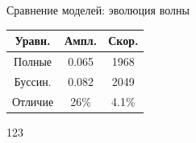 \documentclass[usenames,dvipsnames]{beamer}
\begin{document}
\begin{frame}{Сравнение моделей: эволюция волны}
\vspace{2mm}
\begin{minipage}{\textwidth}
	\begin{minipage}[b]{0.6\textwidth}
	\end{minipage}
	\hfill
	\begin{minipage}[b]{0.39\textwidth}
		\centering
		\begin{tabular}{|c|c|c|}
			\hline 
			Уравн. & Ампл. & Скор. \\ 
			\hline 
			Полные & 0.065 & 1968 \\ 
			\hline 
			Буссин. & 0.082 & 2049 \\ 
			\hline 
			Отличие & 26\% & 4.1\% \\
			\hline
		\end{tabular}
		{\color{white}\vspace{2mm}123}
	\end{minipage}
\end{minipage}
\end{frame}
\end{document}
